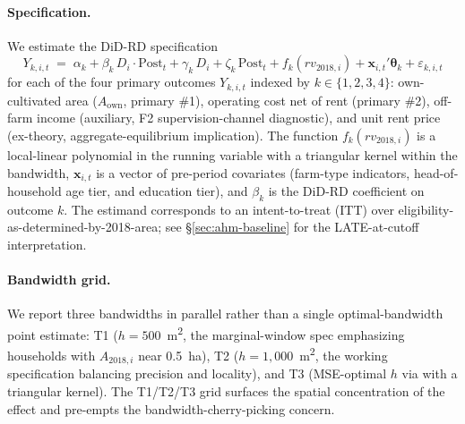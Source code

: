 \documentclass[12pt, a4paper]{article}
\begin{document}
\paragraph{Specification.} We estimate the DiD-RD specification
\begin{equation}
Y_{k,i,t} \;=\; \alpha_k + \beta_k\, D_i \cdot \text{Post}_t + \gamma_k\, D_i + \zeta_k\, \text{Post}_t + f_k(rv_{2018,i}) + \mathbf{x}_{i,t}'\boldsymbol\theta_k + \varepsilon_{k,i,t}
\label{eq:didrd-main}
\end{equation}
for each of the four primary outcomes $Y_{k,i,t}$ indexed by $k \in \{1, 2, 3, 4\}$: own-cultivated area ($A_{\text{own}}$, primary \#1), operating cost net of rent (primary \#2), off-farm income (auxiliary, F2 supervision-channel diagnostic), and unit rent price (ex-theory, aggregate-equilibrium implication). The function $f_k(rv_{2018,i})$ is a local-linear polynomial in the running variable with a triangular kernel within the bandwidth, $\mathbf{x}_{i,t}$ is a vector of pre-period covariates (farm-type indicators, head-of-household age tier, and education tier), and $\beta_k$ is the DiD-RD coefficient on outcome $k$. The estimand corresponds to an intent-to-treat (ITT) over eligibility-as-determined-by-2018-area; see \S\ref{sec:ahm-baseline} for the LATE-at-cutoff interpretation.

\paragraph{Bandwidth grid.} We report three bandwidths in parallel rather than a single optimal-bandwidth point estimate: T1 ($h = 500$~m\textsuperscript{2}, the marginal-window spec emphasizing households with $A_{2018,i}$ near 0.5~ha), T2 ($h = 1{,}000$~m\textsuperscript{2}, the working specification balancing precision and locality), and T3 (MSE-optimal $h$ via \citealp{CalonicoCattaneoTitiunik2014_rdrobust} with a triangular kernel). The T1/T2/T3 grid surfaces the spatial concentration of the effect and pre-empts the bandwidth-cherry-picking concern.
\end{document}
